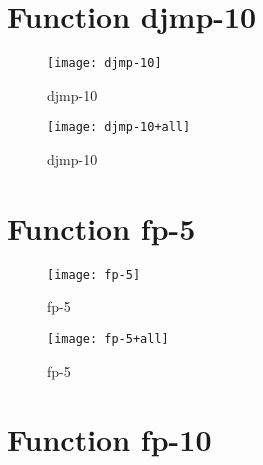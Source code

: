 \newpage

\section{Function djmp-10}

\begin{center}

\end{center}

\begin{figure}[h]
\begin{center}
\texttt{[image: djmp-10]}
\caption{djmp-10}
\end{center}
\end{figure}

\begin{figure}[h]
\begin{center}
\texttt{[image: djmp-10+all]}
\caption{djmp-10}
\end{center}
\end{figure}

\newpage

\section{Function fp-5}

\begin{center}

\end{center}

\begin{figure}[h]
\begin{center}
\texttt{[image: fp-5]}
\caption{fp-5}
\end{center}
\end{figure}

\begin{figure}[h]
\begin{center}
\texttt{[image: fp-5+all]}
\caption{fp-5}
\end{center}
\end{figure}

\newpage

\section{Function fp-10}

\begin{center}

\end{center}

